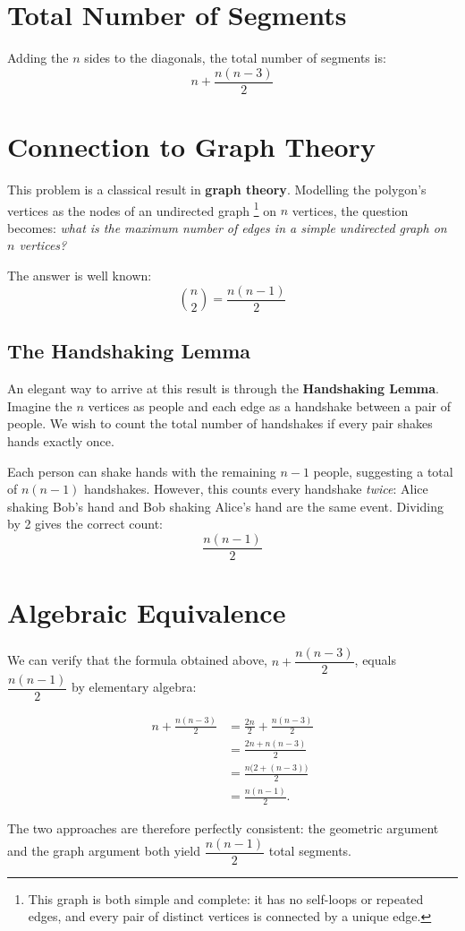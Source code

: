 \documentclass[12pt, a4paper]{article}
\begin{document}
\section*{Total Number of Segments}

Adding the $n$ sides to the diagonals, the total number of segments is:
\[
n + \frac{n(n-3)}{2}
\]

\section*{Connection to Graph Theory}

This problem is a classical result in \textbf{graph theory}. Modelling the polygon's vertices as the nodes of an undirected graph \footnote{This graph is both simple and complete: it has no self-loops or repeated edges, and every pair of distinct vertices is connected by a unique edge.} on $n$ vertices, the question becomes: \emph{what is the maximum number of edges in a simple undirected graph on $n$ vertices?}

The answer is well known:
\[
\binom{n}{2} = \frac{n(n-1)}{2}
\]

\subsection*{The Handshaking Lemma}

An elegant way to arrive at this result is through the \textbf{Handshaking Lemma}. Imagine the $n$ vertices as people and each edge as a handshake between a pair of people. We wish to count the total number of handshakes if every pair shakes hands exactly once.

Each person can shake hands with the remaining $n - 1$ people, suggesting a total of $n(n-1)$ handshakes. However, this counts every handshake \emph{twice}: Alice shaking Bob's hand and Bob shaking Alice's hand are the same event. Dividing by 2 gives the correct count:
\[
\frac{n(n-1)}{2}
\]
\pagebreak
\section*{Algebraic Equivalence}

We can verify that the formula obtained above, $n + \dfrac{n(n-3)}{2}$, equals $\dfrac{n(n-1)}{2}$ by elementary algebra:

\begin{align*}
n + \frac{n(n-3)}{2}
&= \frac{2n}{2} + \frac{n(n-3)}{2} \\[6pt]
&= \frac{2n + n(n-3)}{2} \\[6pt]
&= \frac{n\bigl(2 + (n-3)\bigr)}{2} \\[6pt]
&= \frac{n(n-1)}{2}.
\end{align*}

The two approaches are therefore perfectly consistent: the geometric argument and the graph argument both yield $\dfrac{n(n-1)}{2}$ total segments.
\end{document}
